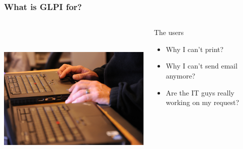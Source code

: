 \documentclass{beamer}
\begin{document}
\begin{frame}
    \frametitle{What is GLPI for?}

 \begin{columns}
 \begin{column}{0.35\textwidth}
         \includegraphics[height=7.5cm]{./pics/lenovo.jpg}
 \end{column}
 \begin{column}{0.65\textwidth}

    \begin{block}{The users}
        \begin{itemize}
            \item Why I can't print?
            \item Why I can't send email anymore?
            \item Are the IT guys really working on my request?
        \end{itemize}
    \end{block}
 \end{column}
\end{columns}

\end{frame}
\end{document}
